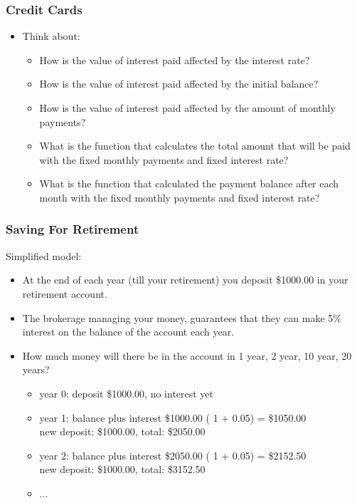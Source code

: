 \documentclass[notheorems
          ]
          {beamer}
\begin{document}
\begin{frame}
 \frametitle {   Credit Cards   }
 
 \begin{itemize}
  \item Think about:
  \begin{itemize}
   \item How is the value of interest paid affected by the interest rate?
   \item How is the value of interest paid affected by the initial balance?
   \item How is the value of interest paid affected by the amount of monthly payments? 
   \vspace{2em}
   \item What is the function that calculates the total amount that will be paid
   with the fixed monthly payments and fixed interest rate? 
   \item What is the function that calculated the payment balance after each month 
   with the fixed monthly payments and fixed interest rate? 
  \end{itemize}

 \end{itemize}


\end{frame}





\begin{frame}
 \frametitle { Saving For Retirement   } 
 
 Simplified model:
 
 \begin{itemize}
  \item At the end of each year (till your retirement) you deposit \$1000.00 in 
  your retirement account. 
  \item The brokerage managing your money, guarantees that they can make 5\% interest
  on the balance of the account each year. 
  \item How much money will there be in the account in 1 year, 2 year, 10 year, 20 years? 
  \begin{itemize}
   \item year 0: deposit \$1000.00, no interest yet 
   \item year 1: balance plus interest \$1000.00 ( 1 + 0.05) = \$1050.00 \\
   new deposit:  \$1000.00, total: \$2050.00 
   \item year 2: balance plus interest \$2050.00 ( 1 + 0.05) = \$2152.50 \\ 
   new deposit:  \$1000.00, total:  \$3152.50 
   \item ...
  \end{itemize}

 \end{itemize}


\end{frame}
\end{document}
